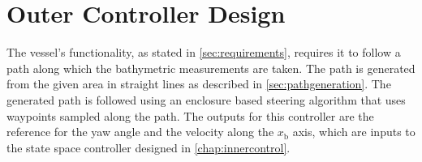 \chapter{Outer Controller Design}\label{chap:outerController}

The vessel's functionality, as stated in \autoref{sec:requirements}, requires it to follow a path along which the bathymetric measurements are taken. The path is generated from the given area in straight lines as described in \autoref{sec:pathgeneration}.  The generated path is followed using an enclosure based steering algorithm \cite[pp. 258-265]{TFossen} that uses waypoints sampled along the path. The outputs for this controller are the reference for the yaw angle and the velocity along the $x_\mathrm{b}$ axis, which are inputs to the state space controller designed in \autoref{chap:innercontrol}.

